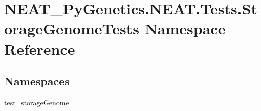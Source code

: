 \hypertarget{namespaceNEAT__PyGenetics_1_1NEAT_1_1Tests_1_1StorageGenomeTests}{}\section{N\+E\+A\+T\+\_\+\+Py\+Genetics.\+N\+E\+A\+T.\+Tests.\+Storage\+Genome\+Tests Namespace Reference}
\label{namespaceNEAT__PyGenetics_1_1NEAT_1_1Tests_1_1StorageGenomeTests}
\subsection*{Namespaces}
\begin{DoxyCompactItemize}
\item 
 \hyperlink{namespaceNEAT__PyGenetics_1_1NEAT_1_1Tests_1_1StorageGenomeTests_1_1test__storageGenome}{test\+\_\+storage\+Genome}
\end{DoxyCompactItemize}
